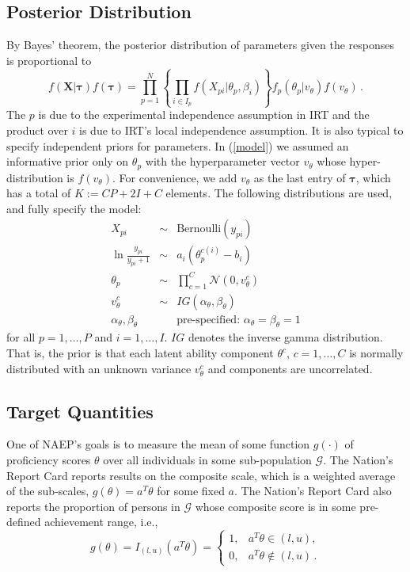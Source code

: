 \documentclass{article}
\newcommand{\Normal}{\mathcal{N}}
\newcommand{\G}{\mathcal{G}}
\newcommand{\bX}{\mathbf{X}}
\newcommand{\bt}{\boldsymbol\tau}
\newcommand{\st}{v_{\ta}}
\newcommand{\ta}{\theta}
\begin{document}
\subsection{Posterior Distribution}
By Bayes' theorem, the posterior distribution of parameters given the responses is proportional to
\begin{equation}
  f(\bX|\bt) f(\bt) = \prod_{p=1}^N \left\{ \prod_{i \in I_p} f(X_{pi}|\ta_p,\beta_i) \right\} f_p(\ta_p|\st) f(\st)\,.
  \label{model}
\end{equation}
The $p$ is due to the experimental independence assumption in IRT and the product over $i$ is due to IRT’s local independence assumption. It is also typical to specify independent priors for parameters. In (\ref{model}) we assumed an informative prior only on $\ta_p$ with the hyperparameter vector $\st$ whose hyper-distribution is $f(\st)$. For convenience, we add $\st$ as the last entry of $\bt$, which has a total of $K := C P + 2 I + C$ elements. The following distributions are used, and fully specify the model:
\begin{eqnarray}
	X_{pi} &\sim& {\mbox{Bernoulli}}(y_{pi})
	\label{dist_x} \\
	\ln \frac{y_{pi}}{y_{pi}+1} &\sim& a_i (\ta_{p}^{c(i)} - b_i)
	\label{dist_y} \\
	\ta_p &\sim& \prod_{c=1}^C \Normal(0, \st^c)
	\label{dist_ta} \\
	\st^c &\sim& IG(\alpha_{\ta}, \beta_{\ta})
	\label{dist_st} \\
	\alpha_{\ta}, \beta_{\ta} && {\mbox{pre-specified: }} \alpha_{\ta} = \beta_{\ta} = 1
	\label{dist_ab}
\end{eqnarray}
for all $p=1,\dots,P$ and $i=1,\dots,I$. $IG$ denotes the inverse gamma distribution. That is, the prior is that each latent ability component $\ta^c$, $c=1,\dots,C$ is normally distributed with an unknown variance $\st^c$ and components are uncorrelated.

\subsection{Target Quantities}
One of NAEP's goals is to measure the mean of some function $g(\cdot)$ of proficiency scores $\ta$ over all individuals in some sub-population $\G$. The Nation's Report Card reports results on the composite scale, which is a weighted average of the sub-scales, $g(\ta) = a^T \ta$ for some fixed $a$. The Nation's Report Card also reports the proportion of persons in $\G$ whose composite score is in some pre-defined achievement range, i.e.,
\begin{equation}
	g(\ta) = I_{(l,u)}(a^T \ta) =
  \begin{cases}
    1, & a^T \ta \in (l,u), \\
    0, & a^T \ta \not \in (l,u)\,.
  \end{cases}
\end{equation}
\end{document}
